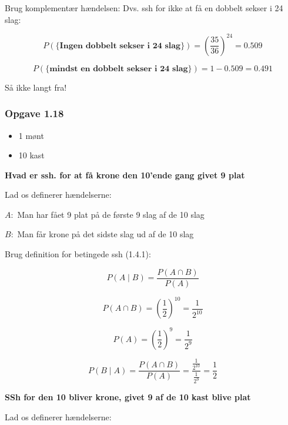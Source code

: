 Brug komplementær hændelsen: Dvs. ssh for ikke at få en dobbelt sekser i 24 slag:

\begin{equation}
    P(\{\textbf{Ingen dobbelt sekser i 24 slag} \}) = (\frac{35}{36})^{24} = 0.509
\end{equation}

\begin{equation}
    P(\{\textbf{mindst en dobbelt sekser i 24 slag} \}) = 1 - 0.509 = 0.491
\end{equation}

Så ikke langt fra!

\subsubsection{Opgave 1.18}

\begin{itemize}
    \item 1 mønt
    \item 10 kast
\end{itemize}

\textbf{Hvad er ssh. for at få krone den 10'ende gang givet 9 plat}

Lad os definerer hændelserne:

$A:$ Man har fået 9 plat på de første 9 slag af de 10 slag

$B:$ Man får krone på det sidste slag ud af de 10 slag

Brug definition for betingede ssh (1.4.1):

\begin{equation}
    P(A \mid B) = \frac{P(A \cap B)}{P(A)}
\end{equation}

\begin{equation}
    P(A \cap B) = (\frac{1}{2})^{10} = \frac{1}{2^{10}}
\end{equation}

\begin{equation}
    P(A) = (\frac{1}{2})^{9} = \frac{1}{2^9}
\end{equation}

\begin{equation}
    P(B \mid A) = \frac{P(A \cap B)}{P(A)} = \frac{ \frac{1}{2^{10}}}{\frac{1}{2^9}} = \frac{1}{2}
\end{equation}

\textbf{SSh for den 10 bliver krone, givet 9 af de 10 kast blive plat}

Lad os definerer hændelserne:

